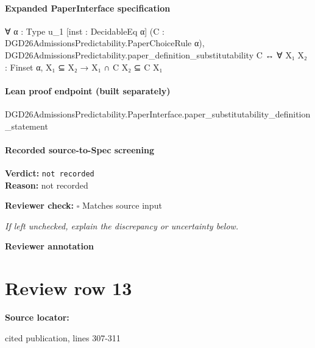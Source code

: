 \documentclass[10pt]{article}
\newcommand{\reviewerbox}{%
  \par\noindent\fbox{\parbox{0.96\linewidth}{\rule{0pt}{0.38in}}}\par
}
\newcommand{\reviewmatch}[1]{%
  \par\noindent\textbf{Reviewer check:} $\square$\; #1\par
  \noindent\emph{If left unchecked, explain the discrepancy or uncertainty below.}\par
}
\begin{document}
\paragraph{Expanded PaperInterface specification}
\begin{ReviewVerbatim}
∀ {α : Type u_1} [inst : DecidableEq α] (C : DGD26AdmissionsPredictability.PaperChoiceRule α),
  DGD26AdmissionsPredictability.paper_definition_substitutability C ↔ ∀ {X₁ X₂ : Finset α}, X₁ ⊆ X₂ → X₁ ∩ C X₂ ⊆ C X₁
\end{ReviewVerbatim}

\paragraph{Lean proof endpoint (built separately)}\begin{ReviewVerbatim}
DGD26AdmissionsPredictability.PaperInterface.paper_substitutability_definition_statement
\end{ReviewVerbatim}

\paragraph{Recorded source-to-Spec screening}
\textbf{Verdict:} \texttt{not recorded}
\\
\textbf{Reason:} not recorded
\reviewmatch{Matches source input}
\noindent\textbf{Reviewer annotation}\par
\reviewerbox
\clearpage
\hypertarget{source-claim-69b86836fa7d4d06}{}
\section*{Review row 13}
\textbf{Source locator:} {\footnotesize\raggedright cited publication, lines 307-\allowbreak{}311\par}
\end{document}
